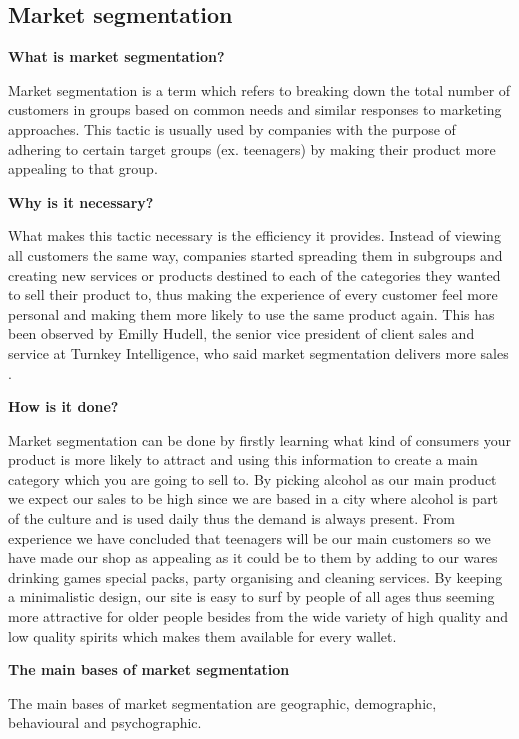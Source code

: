 \documentclass[12p]{article}
\begin{document}
\subsection{Market segmentation} \label{MarketSegmentation}

\textbf{What is market segmentation?}

Market segmentation is a term which refers to breaking down the total number of customers in groups based on common needs and similar responses to marketing approaches. This tactic is usually used by companies with the purpose of adhering to certain target groups (ex. teenagers) by making their product more appealing to that group.

\textbf{Why is it necessary?}

What makes this tactic necessary is the efficiency it provides. Instead of viewing all customers the same way, companies started spreading them in subgroups and creating new services or products destined to each of the categories they wanted to sell their product to, thus making the experience of every customer feel more personal and making them more likely to use the same product again. This has been observed by Emilly Hudell, the senior vice president of client sales and service at Turnkey Intelligence, who said market segmentation delivers more sales \cite{MarketSegmentationEfficieny}.

\textbf{How is it done?}

Market segmentation can be done by firstly learning what kind of consumers your product is more likely to attract and using this information to create a main category which you are going to sell to. By picking alcohol as our main product we expect our sales to be high since we are based in a city where alcohol is part of the culture and is used daily thus the demand is always present. From experience we have concluded that teenagers will be our main customers so we have made our shop as appealing as it could be to them by adding to our wares drinking games special packs, party organising and cleaning services. By keeping a minimalistic design, our site is easy to surf by people of all ages thus seeming more attractive for older people besides from the wide variety of high quality and low quality spirits which makes them available for every wallet.

\textbf{The main bases of market segmentation}

The main bases of market segmentation are geographic, demographic, behavioural and psychographic. 
\end{document}
